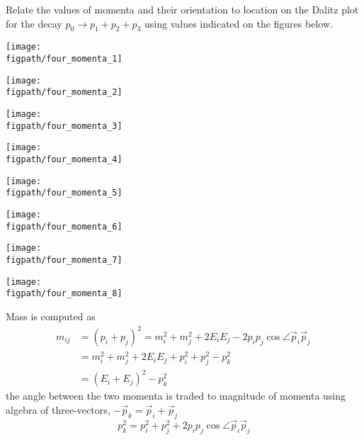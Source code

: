 Relate the values of momenta and their orientation to location on the Dalitz plot for the decay $p_0\to p_1+p_2+p_3$
using values indicated on the figures below.

\begin{center}
    \centering
    \begin{minipage}[c]{0.22\textwidth}
        \texttt{[image: \\figpath/four\_momenta\_1]}
    \end{minipage}
    \hfill
    \begin{minipage}[c]{0.22\textwidth}
        \texttt{[image: \\figpath/four\_momenta\_2]}
    \end{minipage}
    \hfill
    \begin{minipage}[c]{0.22\textwidth}
        \texttt{[image: \\figpath/four\_momenta\_3]}
    \end{minipage}
    \hfill
    \begin{minipage}[c]{0.22\textwidth}
        \texttt{[image: \\figpath/four\_momenta\_4]}
    \end{minipage}
    \begin{minipage}[c]{0.22\textwidth}
        \texttt{[image: \\figpath/four\_momenta\_5]}
    \end{minipage}
    \hfill
    \begin{minipage}[c]{0.22\textwidth}
        \texttt{[image: \\figpath/four\_momenta\_6]}
    \end{minipage}
    \hfill
    \begin{minipage}[c]{0.22\textwidth}
        \texttt{[image: \\figpath/four\_momenta\_7]}
    \end{minipage}
    \hfill
    \begin{minipage}[c]{0.22\textwidth}
        \texttt{[image: \\figpath/four\_momenta\_8]}
    \end{minipage}
\end{center}

\begin{solution}
    Mass is computed as
    \begin{align*}
        m_{ij} & = (p_i+p_j)^2 = m_i^2 + m_j^2 + 2 E_i E_j - 2p_i p_j \cos \angle \vec p_i \vec p_j\, \\
               & =m_i^2 + m_j^2 + 2 E_i E_j + p_i^2 + p_j^2 - p_k^2 \,                                \\
               & = (E_i + E_j)^2 - p_k^2
    \end{align*}
    the angle between the two momenta is traded to magnitude of momenta using algebra of three-vectors, $-\vec p_k = \vec p_i + \vec p_j $
    $$
        p_k^2  = p_i^2 + p_j^2 + 2 p_i p_j \cos \angle \vec p_i \vec p_j
    $$
\end{solution}
